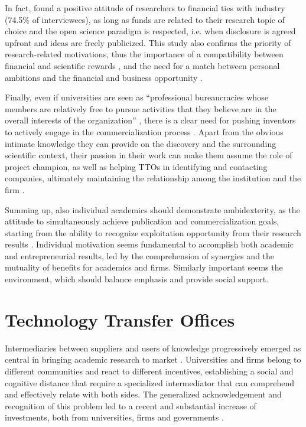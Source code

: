 In fact, \citet{DEste2011} found a positive attitude of researchers to financial ties with industry (74.5\% of interviewees), as long as funds are related to their research topic of choice and the open science paradigm is respected, i.e. when disclosure is agreed upfront and ideas are freely publicized. This study also confirms the priority of research-related motivations, thus the importance of a compatibility between financial and scientific rewards \citep{Link2007, Baldini2007}, and the need for a match between personal ambitions and the financial and business opportunity \citep{Tijssen2006}.

Finally, even if universities are seen as \enquote{professional bureaucracies whose members are relatively free to pursue activities that they believe are in the overall interests of the organization} \citep{DEste2011}, there is a clear need for pushing inventors to actively engage in the commercialization process \citep{Jensen1998}. Apart from the obvious intimate knowledge they can provide on the discovery and the surrounding scientific context, their passion in their work can make them assume the role of project champion, as well as helping TTOs in identifying and contacting companies, ultimately maintaining the relationship among the institution and the firm \citep{Markman2005}.

Summing up, also individual academics should demonstrate ambidexterity, as the attitude to simultaneously achieve publication and commercialization goals, starting from the ability to recognize exploitation opportunity from their research results \citep{Chang2016}. Individual motivation seems fundamental to accomplish both academic and entrepreneurial results, led by the comprehension of synergies and the mutuality of benefits for academics and firms. Similarly important seems the environment, which should balance emphasis and provide social support. 

\section{Technology Transfer Offices}

Intermediaries between suppliers and users of knowledge progressively emerged as central in bringing academic research to market \citep{Landry2013}. Universities and firms belong to different communities and react to different incentives, establishing a social and cognitive distance that require a specialized intermediator that can comprehend and effectively relate with both sides. The generalized acknowledgement and recognition of this problem led to a recent and substantial increase of investments, both from universities, firms and governments \citep{Muscio2010}.

